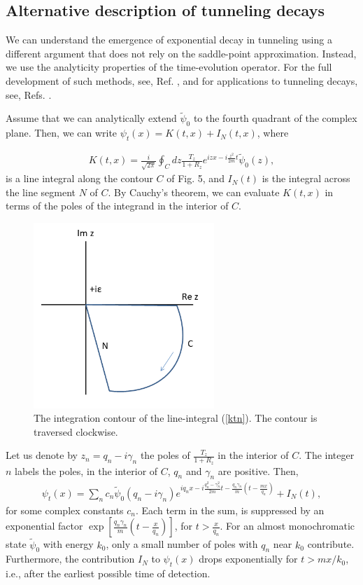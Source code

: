 \documentclass[12pt]{article}
\numberwithin{equation}{section}
\begin{document}
\subsection{Alternative description of tunneling decays}
We can understand the emergence of exponential decay in tunneling using a different argument that does not rely on the saddle-point approximation. Instead, we use the analyticity properties of the time-evolution operator. For the full development of such methods, see, Ref. \cite{RNewt}, and for applications to tunneling decays, see, Refs. \cite{CP75, CMM95, CCM09}.

Assume that we can analytically extend $\tilde{\psi}_0$ to the fourth quadrant of the complex plane. Then, we can write $\psi_t(x) = K(t, x) + I_N(t,x)$, where

\begin{eqnarray}
K(t, x) = \frac{i}{\sqrt{2\pi}}  \oint_C dz  \frac{T_z}{1+R_z}  e^{izx -i\frac{z^2}{2m}t } \tilde{\psi}_0(z), \label{ktn}
\end{eqnarray}
is a line integral along the contour $C$ of Fig. 5, and $I_N(t)$ is the integral across the line segment $N$ of $C$.  By Cauchy's theorem, we can evaluate $K(t,x)$  in terms of the poles of the integrand in the interior of $C$.

\begin{figure}
\includegraphics[height=7cm]{curven}
\caption{The integration contour of the line-integral (\ref{ktn}). The contour is traversed clockwise. }
\end{figure}
Let us denote by $z_n = q_n -i \gamma_n$ the poles of $\frac{T_z}{1+R_z} $ in  the interior of $C$. The integer $n$ labels the poles, in the interior of $C$, $q_n$ and $\gamma_n$ are positive. Then,
\begin{eqnarray}
\psi_t(x) = \sum_n c_n \tilde{\psi}_0(q_n -i \gamma_n) e^{iq_n x - i\frac{q_n^2-\gamma_n^2}{2m}t - \frac{q_n\gamma_n}{m}(t - \frac{mx}{q_n})} + I_N(t),
\end{eqnarray}
for some complex constants $c_n$. Each term in the sum, is suppressed by an exponential factor $\exp[\frac{q_n\gamma_n}{m}(t - \frac{x}{q_n})]$, for $t > \frac{x}{q_n}$. For an almost monochromatic state $\tilde{\psi}_0$ with energy $k_0$, only a small number of poles with $q_n$ near $k_0$ contribute. Furthermore, the contribution   $I_N$ to $\psi_t(x)$ drops exponentially for $t > mx/k_0$, i.e., after the earliest possible time of detection.
\end{document}
